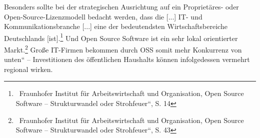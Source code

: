 \documentclass[a4paper]{article}
\begin{document}
{
Besonders sollte bei der strategischen Ausrichtung auf ein
Propriet\"ares- oder Open-Source-Lizenzmodell bedacht werden, dass die
{\guillemotright} [...] IT- und Kommunikationsbranche [...] eine der
bedeutendsten Wirtschaftsbereiche Deutschlands
[ist].{\guillemotleft}\footnote{\ Fraunhofer Institut f\"ur
Arbeitswirtschaft und Organisation, {\quotedblbase}Open Source Software
-- Strukturwandel oder Strohfeuer{\textquotedblleft}, S. 14} Und
{\guillemotright}Open Source Software ist ein sehr lokal orientierter
Markt.{\guillemotleft}\footnote{\ Fraunhofer Institut f\"ur
Arbeitswirtschaft und Organisation, {\quotedblbase}Open Source Software
-- Strukturwandel oder Strohfeuer{\textquotedblleft}, S. 43} Gro{\ss}e
IT-Firmen bekommen durch OSS somit mehr Konkurrenz {\quotedblbase}von
unten{\textquotedblleft} -- Investitionen des \"offentlichen Haushalts
k\"onnen infolgedessen vermehrt regional wirken.}
\end{document}
